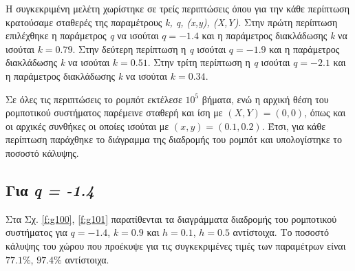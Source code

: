 Η συγκεκριμένη μελέτη χωρίστηκε σε τρείς περιπτώσεις όπου για την κάθε περίπτωση κρατούσαμε σταθερές της παραμέτρους \emph{k, q, (x,y), (X,Y)}.
Στην πρώτη περίπτωση επιλέχθηκε η παράμετρος \emph{q} να ισούται $q = -1.4$ και η παράμετρος διακλάδωσης \emph{k} να ισούται $k = 0.79$. Στην δεύτερη περίπτωση η \emph{q} ισούται $q = -1.9$ και η παράμετρος διακλάδωσης  \emph{k} να ισούται $k = 0.51$. Στην τρίτη περίπτωση η \emph{q} ισούται $q = -2.1$ και η παράμετρος διακλάδωσης  \emph{k} να ισούται $k = 0.34$.

Σε όλες τις περιπτώσεις το ρομπότ εκτέλεσε $10^5$ βήματα, ενώ η αρχική θέση του ρομποτικού συστήματος παρέμεινε σταθερή και ίση με $(X,Y) = (0,0)$, όπως και οι αρχικές συνθήκες οι οποίες ισούται με $(x,y) = (0.1,0.2)$.  Έτσι, για κάθε περίπτωση παράχθηκε το διάγραμμα της διαδρομής του ρομπότ και υπολογίστηκε το ποσοστό κάλυψης. 


\subsection{Για \emph{q = -1.4}}

Στα Σχ. \ref{f:g100}, \ref{f:g101} παρατίθενται τα διαγράμματα διαδρομής του ρομποτικού συστήματος για $q = -1.4$, $k = 0.9$ και $h =0.1$, $h =0.5$ αντίστοιχα. Tο ποσοστό κάλυψης του χώρου που προέκυψε για τις συγκεκριμένες τιμές των παραμέτρων είναι $77.1\%$, $97.4\%$ αντίστοιχα.

